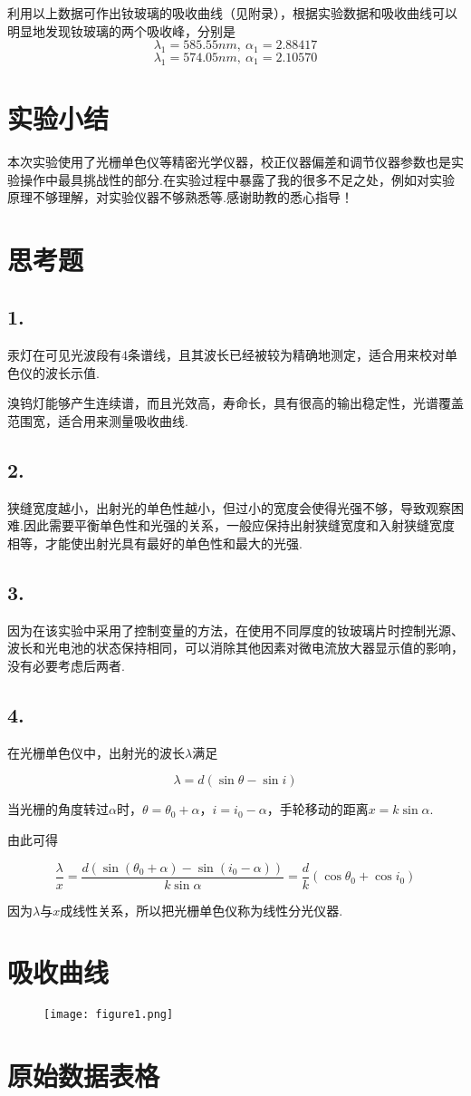 \documentclass{thureport}
\begin{document}
利用以上数据可作出钕玻璃的吸收曲线（见附录），根据实验数据和吸收曲线可以明显地发现钕玻璃的两个吸收峰，分别是
$$\lambda_1=585.55nm,\ \alpha_1=2.88417$$
$$\lambda_1=574.05nm,\ \alpha_1=2.10570$$

\section{实验小结}
本次实验使用了光栅单色仪等精密光学仪器，校正仪器偏差和调节仪器参数也是实验操作中最具挑战性的部分.在实验过程中暴露了我的很多不足之处，例如对实验原理不够理解，对实验仪器不够熟悉等.感谢助教的悉心指导！

\section{思考题}
\subsection*{1.}
汞灯在可见光波段有4条谱线，且其波长已经被较为精确地测定，适合用来校对单色仪的波长示值.

溴钨灯能够产生连续谱，而且光效高，寿命长，具有很高的输出稳定性，光谱覆盖范围宽，适合用来测量吸收曲线.

\subsection*{2.}
狭缝宽度越小，出射光的单色性越小，但过小的宽度会使得光强不够，导致观察困难.因此需要平衡单色性和光强的关系，一般应保持出射狭缝宽度和入射狭缝宽度相等，才能使出射光具有最好的单色性和最大的光强.

\subsection*{3.}
因为在该实验中采用了控制变量的方法，在使用不同厚度的钕玻璃片时控制光源、波长和光电池的状态保持相同，可以消除其他因素对微电流放大器显示值的影响，没有必要考虑后两者.

\subsection*{4.}
在光栅单色仪中，出射光的波长$\lambda$满足

$$\lambda=d(\sin\theta-\sin i)$$

当光栅的角度转过$\alpha$时，$\theta=\theta_0+\alpha$，$i=i_0-\alpha$，手轮移动的距离$x=k\sin\alpha$.

由此可得

$$\frac{\lambda}{x}=\frac{d(\sin(\theta_0+\alpha)-\sin(i_0-\alpha))}{k\sin\alpha}=\frac{d}{k}(\cos\theta_0+\cos i_0)$$

因为$\lambda$与$x$成线性关系，所以把光栅单色仪称为线性分光仪器.

\newpage
\section{吸收曲线}
\begin{figure}[H]
	\centering
	\texttt{[image: figure1.png]}
\end{figure}

\newpage
\section{原始数据表格}
\end{document}
